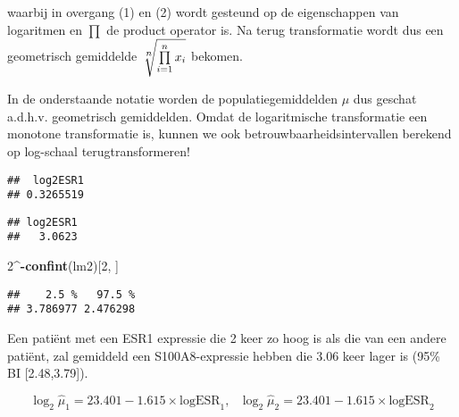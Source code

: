 \documentclass[
  12pt,dutch,coursenotes]{book}
\newenvironment{Shaded}{\begin{snugshade}}{\end{snugshade}}
\newcommand{\DecValTok}[1]{\textcolor[rgb]{0.00,0.00,0.81}{#1}}
\newcommand{\KeywordTok}[1]{\textcolor[rgb]{0.13,0.29,0.53}{\textbf{#1}}}
\newcommand{\NormalTok}[1]{#1}
\newcommand{\OperatorTok}[1]{\textcolor[rgb]{0.81,0.36,0.00}{\textbf{#1}}}
\theoremstyle{definition}
\theoremstyle{definition}
\theoremstyle{definition}
\theoremstyle{remark}
\begin{document}
waarbij in overgang (1) en (2) wordt gesteund op de eigenschappen van logaritmen en \(\prod\) de product operator is.
Na terug transformatie wordt dus een geometrisch gemiddelde \(\sqrt[\leftroot{-1}\uproot{2}\scriptstyle n]{\prod\limits_{i=1}^n x_i}\) bekomen.

In de onderstaande notatie worden de populatiegemiddelden \(\mu\) dus geschat a.d.h.v. geometrisch gemiddelden.
Omdat de logaritmische transformatie een monotone transformatie is, kunnen we ook betrouwbaarheidsintervallen berekend op log-schaal terugtransformeren!

\begin{Shaded}
\end{Shaded}

\begin{verbatim}
##  log2ESR1 
## 0.3265519
\end{verbatim}

\begin{Shaded}
\end{Shaded}

\begin{verbatim}
## log2ESR1 
##   3.0623
\end{verbatim}

\begin{Shaded}
\begin{Highlighting}[]
\DecValTok{2}\OperatorTok{\^{}{-}}\KeywordTok{confint}\NormalTok{(lm2)[}\DecValTok{2}\NormalTok{, ]}
\end{Highlighting}
\end{Shaded}

\begin{verbatim}
##    2.5 %   97.5 % 
## 3.786977 2.476298
\end{verbatim}

Een patiënt met een ESR1 expressie die 2 keer zo hoog is als die van een andere patiënt, zal gemiddeld een S100A8-expressie hebben die 3.06 keer lager is (95\% BI {[}2.48,3.79{]}).

\[\log_2 \hat\mu_1=23.401  -1.615 \times \text{logESR}_1,\text{ } \log_2 \hat\mu_2=23.401  -1.615 \times \text{logESR}_2 \]
\end{document}

